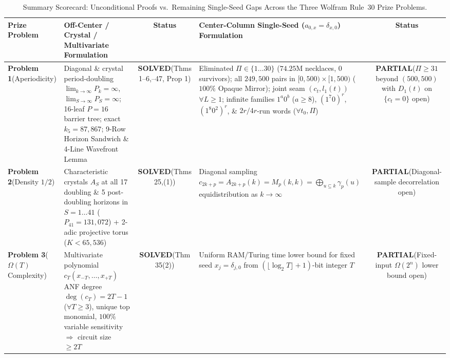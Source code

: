 \documentclass[11pt,a4paper]{article}
\theoremstyle{definition}
\theoremstyle{remark}
\begin{document}
\begin{table}[htbp]
\centering
\caption{Summary Scorecard: Unconditional Proofs vs.\ Remaining Single-Seed Gaps Across the Three Wolfram Rule~30 Prize Problems.}
\label{tab:scorecard}
\renewcommand{\arraystretch}{1.25}
\footnotesize
\begin{tabular}{@{}>{\raggedright\arraybackslash}p{}>{\raggedright\arraybackslash}p{}c>{\raggedright\arraybackslash}p{}c@{}}
\toprule
\textbf{Prize Problem} & \textbf{Off-Center / Crystal / Multivariate Formulation} & \textbf{Status} & \textbf{Center-Column Single-Seed ($a_{0,x}=\delta_{x,0}$) Formulation} & \textbf{Status} \\
\midrule
\textbf{Problem 1}\newline (Aperiodicity) &
Diagonal \& crystal period-doubling $\lim_{k\to\infty} P_k = \infty$, $\lim_{S\to\infty} P_S = \infty$; 16-leaf $P=16$ barrier tree; exact $k_5 = 87{,}867$; 9-Row Horizon Sandwich \& 4-Line Wavefront Lemma &
\textbf{SOLVED}\newline (Thms 1--6,\newline 45--47, Prop 1) &
Eliminated $\Pi \in \{1\dots 30\}$ ($74.25\text{M}$ necklaces, 0 survivors); all $249{,}500$ pairs in $[0,500)\times[1,500)$ ($100\%$ Opaque Mirror); joint seam $(c_t,l_1(t))$ $\forall L \ge 1$; infinite families $1^a 0^b$ ($a\ge 8$), $(1^7 0)^r$, $(1^8 0^2)^r$, \& $2r/4r$-run words ($\forall t_0,\Pi$) &
\textbf{PARTIAL}\newline ($\Pi \ge 31$ beyond $(500,500)$ with $D_1(t)$ on $\{c_t=0\}$ open) \\
\addlinespace
\textbf{Problem 2}\newline (Density $1/2$) &
Characteristic crystals $A_S$ at all 17 doubling \& 5 post-doubling horizons in $S=1\dots 41$ ($P_{41}=131{,}072$) + 2-adic projective torus ($K < 65{,}536$) &
\textbf{SOLVED}\newline (Thms 25,\newline 35(1)) &
Diagonal sampling $c_{2k+p} = A_{2k+p}(k) = M_p(k,k) = \bigoplus_{u\subseteq k}\gamma_p(u)$ equidistribution as $k \to \infty$ &
\textbf{PARTIAL}\newline (Diagonal-sample decorrelation open) \\
\addlinespace
\textbf{Problem 3}\newline ($\Omega(T)$ Complexity) &
Multivariate polynomial $c_T(x_{-T},\dots,x_{+T})$ ANF degree $\deg(c_T) = 2T-1$ ($\forall T\ge 3$), unique top monomial, $100\%$ variable sensitivity $\Rightarrow$ circuit size $\ge 2T$ &
\textbf{SOLVED}\newline (Thm 35(2)) &
Uniform RAM/Turing time lower bound for fixed seed $x_j = \delta_{j,0}$ from $(\lfloor\log_2 T\rfloor+1)$-bit integer $T$ &
\textbf{PARTIAL}\newline (Fixed-input $\Omega(2^n)$ lower bound open) \\
\bottomrule
\end{tabular}
\end{table}
\end{document}
